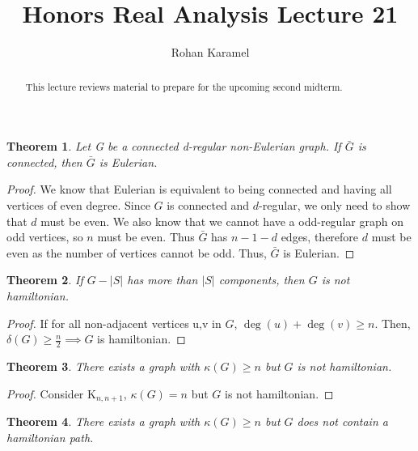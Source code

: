 \documentclass[12pt,reqno]{amsart}
\title{Honors Real Analysis Lecture 21}
\author{Rohan Karamel}
\theoremstyle{plain}
\newtheorem*{theorem}{Theorem}
\begin{document}
    \begin{abstract}
        This lecture reviews material to prepare for the upcoming second midterm.
    \end{abstract}

    \maketitle

    \begin{theorem}
        Let G be a connected d-regular non-Eulerian graph. If $\bar{G}$ is connected, then $\bar{G}$ is Eulerian.
    \end{theorem}

    \begin{proof}
        We know that Eulerian is equivalent to being connected and having all vertices of even degree.
        Since $G$ is connected and $d$-regular, we only need to show that $d$ must be even.
        We also know that we cannot have a odd-regular graph on odd vertices, so $n$ must be even.
        Thus $\bar{G}$ has $n - 1 - d$ edges, therefore $d$ must be even as the number of vertices cannot be odd. 
        Thus, $\bar{G}$ is Eulerian.
    \end{proof}

    \begin{theorem}
        If $G - |S|$ has more than $|S|$ components, then $G$ is not hamiltonian.
    \end{theorem}

    \begin{proof}
        If for all non-adjacent vertices u,v in $G$, $\deg(u) + \deg(v) \ge n$.
        Then, $\delta(G) \ge \frac{n}{2} \implies G$ is hamiltonian.
    \end{proof}

    \begin{theorem}
        There exists a graph with $\kappa(G) \ge n$ but $G$ is not hamiltonian.
    \end{theorem}

    \begin{proof}
        Consider K$_{n,n+1}$, $\kappa(G) = n$ but $G$ is not hamiltonian.
    \end{proof}

    \begin{theorem}
        There exists a graph with $\kappa(G) \ge n$ but $G$ does not contain a hamiltonian path.
    \end{theorem}
\end{document}
